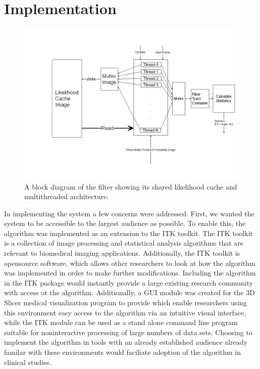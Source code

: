 \chapter{Implementation}
\begin{figure} \label{fig:filterblock}
	\includegraphics[width=0.5\linewidth]{filterblock}
	\caption{A block diagram of the filter showing its shared likelihood cache and multithreaded architecture.}
\end{figure}
In implementing the system a few concerns were addressed.  First, we wanted the system to be accessible to the largest audience as possible.  To enable this, the algorithm was implemented as an extension to the ITK toolkit.  The ITK toolkit is a collection of image processing and statistical analysis algorithms that are relevant to biomedical imaging applications.  Additionally, the ITK toolkit is opensource software, which allows other researchers to look at how the algorithm was implemented in order to make further modifications.  Including the algorithm in the ITK package would instantly provide a large existing research community with access ot the algorithm.  Additionally, a GUI module was created for the 3D Slicer medical visualization program to provide which enable researchers using this environment easy access to the algorithm via an intuitive visual interface, while the ITK module can be used as a stand alone command line program suitable for noninteractive processing of large numbers of data sets.  Choosing to implement the algorithm in tools with an already established audience already familar with these environments would faciliate adoption of the algorithm in clinical studies.

